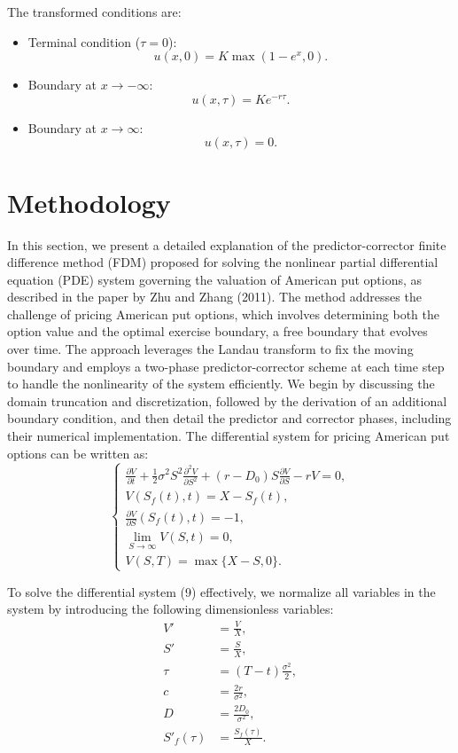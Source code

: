 \documentclass{article}
\begin{document}
The transformed conditions are:
\begin{itemize}
    \item Terminal condition (\( \tau = 0 \)):
    \[
    u(x, 0) = K \max(1 - e^x, 0).
    \]
    \item Boundary at \( x \to -\infty \):
    \[
    u(x, \tau) = K e^{-r \tau}.
    \]
    \item Boundary at \( x \to \infty \):
    \[
    u(x, \tau) = 0.
    \]
\end{itemize}


\appendix
\renewcommand{\thesection}{\arabic{section}}
\section{Methodology}
\label{sec:predictor-corrector}

In this section, we present a detailed explanation of the predictor-corrector finite difference method (FDM) proposed for solving the nonlinear partial differential equation (PDE) system governing the valuation of American put options, as described in the paper by Zhu and Zhang (2011). The method addresses the challenge of pricing American put options, which involves determining both the option value and the optimal exercise boundary, a free boundary that evolves over time. The approach leverages the Landau transform to fix the moving boundary and employs a two-phase predictor-corrector scheme at each time step to handle the nonlinearity of the system efficiently. We begin by discussing the domain truncation and discretization, followed by the derivation of an additional boundary condition, and then detail the predictor and corrector phases, including their numerical implementation.
The differential system for pricing American put options can be written as:
\begin{equation}
\begin{cases}
\frac{\partial V}{\partial t} + \frac{1}{2}\sigma^2S^2\frac{\partial^2 V}{\partial S^2} + (r - D_0)S\frac{\partial V}{\partial S} - rV = 0, \\
V(S_f(t),t) = X - S_f(t), \\
\frac{\partial V}{\partial S}(S_f(t),t) = -1, \\
\lim_{S\to\infty} V(S,t) = 0, \\
V(S, T) = \max\{X - S, 0\}.
\end{cases}
\end{equation}

To solve the differential system (9) effectively, we normalize all variables in the system by introducing the following dimensionless variables:
\begin{align*}
V' &= \frac{V}{X}, \\
S' &= \frac{S}{X}, \\
\tau &= (T - t)\frac{\sigma^2}{2}, \\
c &= \frac{2r}{\sigma^2}, \\
D &= \frac{2D_0}{\sigma^2}, \\
S'_f(\tau) &= \frac{S_f(\tau)}{X}.
\end{align*}
\end{document}
